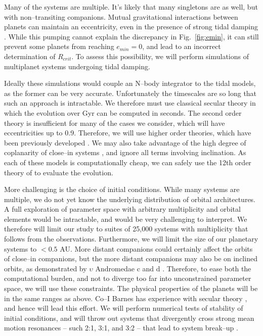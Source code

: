 Many of the \kepler systems are multiple.  It's likely that many
singletons are as well, but with non--transiting companions.  Mutual
gravitational interactions between planets can maintain an
eccentricity, even in the presence of strong tidal damping
\citep{MardlingLin02,GreenbergVanLaerhoven11,Correia12}.  While this
pumping cannot explain the discrepancy in Fig.~\ref{fig:emin}, it can
still prevent some planets from reaching $e_{min} = 0$, and lead to an
incorrect determination of $R_{crit}$.  To assess this possibility, we
will perform simulations of multiplanet systems undergoing tidal
damping.

Ideally these simulations would couple an N--body integrator to the
tidal models, as the former can be very accurate.  Unfortunately the
timescales are so long that such an approach is intractable.  We
therefore must use classical secular theory in which the evolution over
Gyr can be computed in seconds.  The second order theory is
insufficient for many of the cases we consider, which will have
eccentricities up to 0.9.  Therefore, we will use higher order
theories, which have been previously developed
\citep[e.g.][]{Ford00,VerasArmitage04,LibertHenrard05}.  We may also
take advantage of the high degree of coplanarity of close--in
\kepler systems \cite{Fabrycky12}, and ignore all terms involving
inclination.  As each of these models is computationally cheap, we can
safely use the 12th order theory of \cite{LibertHenrard05} to evaluate
the evolution.  

More challenging is the choice of initial conditions.  While many
\kepler systems are multiple, we do not yet know the underlying
distribution of orbital architectures.  A full exploration of
parameter space with arbitrary multiplicity and orbital elements would
be intractable, and would be very challenging to interpret.  We
therefore will limit our study to suites of 25,000 systems with
multiplicity that follows from the observations.  Furthermore, we will
limit the size of our planetary systems to $<0.5$ AU.  More distant
companions could certainly affect the orbits of close--in companions,
but the more distant companions may also be on inclined orbits, as
demonstrated by $\upsilon$ Andromedae c and d
\citep{McArthur10,ReffertQuirrenbach11}.  Therefore, to ease both the
computational burden, and not to diverge too far into unconstrained
parameter space, we will use these constraints.  The physical
properties of the planets will be in the same ranges as above.  Co--I
Barnes has experience with secular theory
\citep{BarnesGreenberg06a,BarnesGreenberg06b}, and hence will lead
this effort.  We will perform numerical tests of stability of initial
conditions, and will throw out systems that divergently cross strong
mean motion resonances -- such 2:1, 3:1, and 3:2 -- that lead to
system break--up \citep[e.g.][]{Gomes05}.

